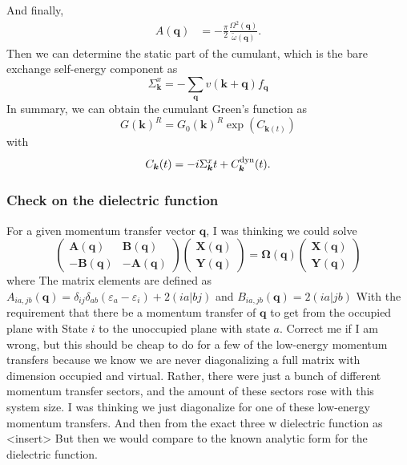 And finally,
\begin{align}
A(\mathbf{q}) &= -\frac{\pi}{2} \frac{\Omega^2(\mathbf{q})}{\tilde{\omega}(\mathbf{q})}.
\end{align}
Then we can determine the static part of the cumulant, which is the bare exchange self-energy component as 
\begin{equation}
    \Sigma^x_{\bm{k}} = -\sum_{\mathbf{q}} v(\mathbf{k}+\mathbf{q}) f_{\mathbf{q}}
\end{equation}
In summary, we can obtain the cumulant Green's function as 
\begin{equation}
    G(\bm{k})^R = G_0(\bm{k})^R \exp(C_{\bm{k}(t)})
\end{equation}
with
\begin{equation}
    C_{\bm{k}}(t) = -i \Sigma^x_{\bm{k}} t + C^{\rm dyn}_{\bm{k}}(t).
\end{equation}
\subsubsection{Check on the dielectric function}
For a given momentum transfer vector $\mathbf{q}$, I was thinking we could solve 
\begin{equation}
\begin{pmatrix}
\bm{A}(\mathbf{q}) & \bm{B}(\mathbf{q}) \\
-\bm{B}(\mathbf{q}) & -\bm{A}(\mathbf{q})
\end{pmatrix}
\begin{pmatrix}
\bm{X}(\mathbf{q})\\
\bm{Y}(\mathbf{q})
\end{pmatrix}
= \bm{\Omega}(\mathbf{q})
\begin{pmatrix}
\bm{X}(\mathbf{q})\\
\bm{Y}(\mathbf{q})
\end{pmatrix}
\end{equation}
where The matrix elements are defined as $A_{ia,jb}(\mathbf{q}) = \delta_{ij} \delta_{ab} (\varepsilon_a - \varepsilon_i) + 2 (ia|bj)$ and $B_{ia,jb}(\mathbf{q}) = 2 (ia|jb)$ With the requirement that there be a momentum transfer of $\mathbf{q}$ to get from the occupied plane with State $i$ to the unoccupied plane with state $a$. Correct me if I am wrong, but this should be cheap to do for a few of the low-energy momentum transfers because we know we are never diagonalizing a full matrix with dimension occupied and virtual. Rather, there were just a bunch of different momentum transfer sectors, and the amount of these sectors rose with this system size. I was thinking we just diagonalize for one of these low-energy momentum transfers. And then from the exact three w dielectric function as <insert> But then we would compare to the known analytic form for the dielectric function. 
